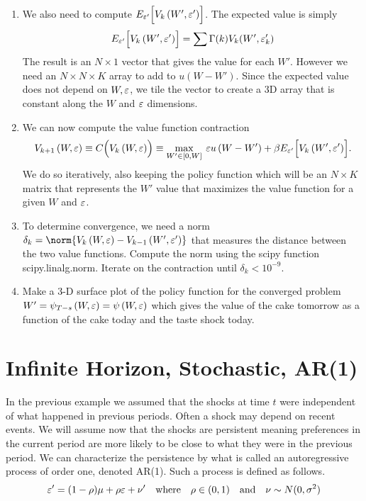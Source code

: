 \begin{problem}
\begin{enumerate}
   \item We also need to compute $E_{\varepsilon'}\Bigl[V_k\left(W',\varepsilon'\right)\Bigr]$.  The expected value is simply
       \begin{equation}
       E_{\varepsilon'}\Bigl[V_k\left(W',\varepsilon'\right)\Bigr] = \sum \Gamma(k)V_k(W',\varepsilon_k')
       \end{equation}  The result is an $N\times 1$ vector that gives the value for each $W'$.  However we need an $N\times N\times K$ array to add to $u(W-W')$.  Since the expected value does not depend on $W,\varepsilon$, we tile the vector to create a 3D array that is constant along the $W$ and $\varepsilon$ dimensions.
           
   \item We can now compute the value function contraction 
     \begin{equation}\label{EqContractStochiid}
      V_{k+1}\left(W,\varepsilon\right) \equiv C\Bigl(V_k\left(W,\varepsilon\right)\Bigr) \equiv \max_{W'\in[0,W]}\: \varepsilon u\left(W-W'\right) + \beta E_{\varepsilon'}\Bigl[V_k\left(W',\varepsilon'\right)\Bigr].
      \end{equation}
        We do so iteratively, also keeping the policy function which will be an $N\times K$ matrix that represents the $W'$ value that maximizes the value function for a given $W$ and $\varepsilon$.

   \item To determine convergence, we need a norm $\delta_k = \norm{V_k\left(W,\ve\right) - V_{k-1}\left(W',\ve'\right)}$ that measures the distance between the two value functions.  Compute the norm using the scipy function scipy.linalg.norm.  Iterate on the contraction until $\delta_k < 10^{-9}$.
       
   \item Make a 3-D surface plot of the policy function for the converged problem $W' = \psi_{T-s}\left(W,\varepsilon\right) = \psi\left(W,\varepsilon\right)$ which gives the value of the cake tomorrow as a function of the cake today  and the taste shock today.

\end{enumerate}
\end{problem}

\newpage
\section{Infinite Horizon, Stochastic, AR(1)}\label{SecRecProbInfinHorStochAR1}

In the previous example we assumed that the shocks at time $t$ were independent of what happened in previous periods.  Often a shock may depend on recent events.  We will assume now that the shocks are persistent meaning preferences in the current period are more likely to be close to what they were in the previous period.  We can characterize the persistence by what is called an autoregressive process of order one, denoted AR(1).  Such a process is defined as follows.
\begin{equation}\label{EqAR1shock}
   \varepsilon' = (1-\rho)\mu + \rho\varepsilon + \nu' \quad\text{where}\quad \rho\in(0,1) \quad\text{and}\quad \nu\sim N(0,\sigma^2)
\end{equation}

